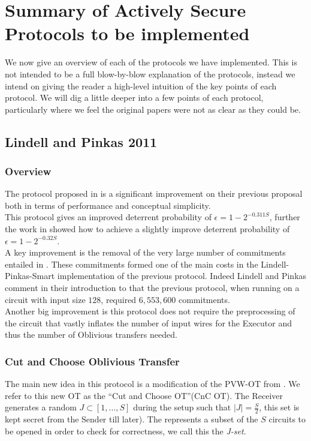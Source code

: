\documentclass[ %
                    author={Nicholas Tutte},
                supervisor={Prof. Nigel Smart},
                    degree={MEng},
                     title={Secure Two Party Computation},
                  subtitle={A practical comparison of recent protocols},
                      type={Research - GG1K},
                      year={2015} ]{dissertation}
\begin{document}
	\chapter{Summary of Actively Secure Protocols to be implemented} \label{sec:Protocols}
		We now give an overview of each of the protocols we have implemented. This is not intended to be a full blow-by-blow explanation of the protocols, instead we intend on giving the reader a high-level intuition of the key points of each protocol. We will dig a little deeper into a few points of each protocol, particularly where we feel the original papers were not as clear as they could be.

		\section{Lindell and Pinkas 2011}
			\subsection{Overview}
				The protocol proposed in \cite{LindellAndPinkas2011} is a significant improvement on their previous proposal \cite{LindellAndPinkas2007} both in terms of performance and conceptual simplicity.\\

				This protocol gives an improved deterrent probability of $\epsilon = 1 - 2^{-0.311 S}$, further the work in \cite{ShelatAndShen} showed how to achieve a slightly improve deterrent probability of $\epsilon = 1 - 2^{-0.32 S}$.\\

				A key improvement is the removal of the very large number of commitments entailed in \cite{LindellAndPinkas2007}. These commitments formed one of the main costs in the Lindell-Pinkas-Smart\cite{LindellPinkasSmart2008} implementation of the previous protocol. Indeed Lindell and Pinkas comment in their introduction to \cite{LindellAndPinkas2011} that the previous protocol, when running on a circuit with input size $128$, required $6,553,600$ commitments.\\

				Another big improvement is this protocol does not require the preprocessing of the circuit that vastly inflates the number of input wires for the Executor and thus the number of Oblivious transfers needed.

			\subsection{Cut and Choose Oblivious Transfer}
				The main new idea in this protocol is a modification of the PVW-OT from \cite{PVW_OT_2008}. We refer to this new OT as the ``Cut and Choose OT''(CnC OT). The Receiver generates a random $J \subset [1, ..., S]$ during the setup such that $\vert J \vert = \frac{S}{2}$,  this set is kept secret from the Sender till later). The represents a subset of the $S$ circuits to be opened in order to check for correctness, we call this the \emph{J-set}.\\
\end{document}
